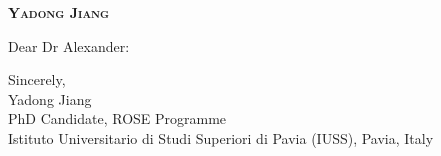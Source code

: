 \documentclass{article}
\begin{document}
\begin{center}

    \Large\selectfont
    \textbf{\textsc{Yadong Jiang}}\\
    
    \normalsize\selectfont
    
    
    
\end{center}
\par




\par
\vspace{15pt}


Dear Dr Alexander:
\par

\par
Sincerely,\\
Yadong Jiang\\
PhD Candidate, ROSE Programme\\
Istituto Universitario di Studi Superiori di Pavia (IUSS), Pavia, Italy
\end{document}
